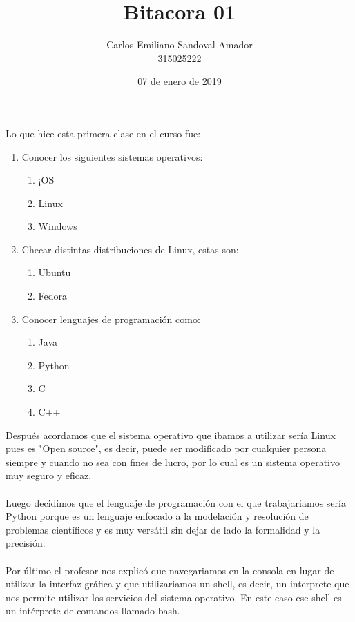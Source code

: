 \documentclass[letterpaper, 12pt, oneside]{article}%
\title{Bitacora 01}
\author{Carlos Emiliano Sandoval Amador \\ 315025222}
\date{07 de enero de 2019}
\begin{document}
	\maketitle
	{Lo que hice esta primera clase en el curso fue:}
	\begin{enumerate}
		\item Conocer los siguientes sistemas operativos:
		\begin{enumerate}
			\item ¡OS
			\item Linux
			\item Windows
		\end{enumerate}
		\item Checar distintas distribuciones de Linux,
		estas son:
		\begin{enumerate}
			\item Ubuntu
			\item Fedora
		\end{enumerate}
		\item Conocer lenguajes de programación como:
		\begin{enumerate}
			\item Java
			\item Python
			\item C
			\item C++
			
		\end{enumerate}
		
	\end{enumerate}
{Después acordamos que el sistema operativo que ibamos a utilizar sería Linux pues es "Open source", es decir, puede ser modificado por cualquier persona siempre y cuando no sea con fines de lucro, por lo cual es un sistema operativo muy seguro y eficaz.\\ \\}
{Luego decidimos que el lenguaje de programación con el que trabajariamos sería Python porque es un lenguaje enfocado a la modelación y resolución de problemas científicos y es muy versátil sin dejar de lado la formalidad y la precisión. \\ \\}
{Por último el profesor nos explicó que navegariamos en la consola en lugar de utilizar la interfaz gráfica y que utilizariamos un shell, es decir, un interprete que nos permite utilizar los servicios del sistema operativo. En este caso ese shell es un intérprete de comandos llamado bash.}
	
\end{document}
